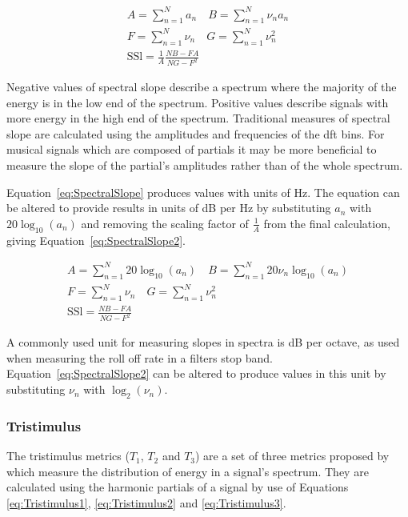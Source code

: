 			\begin{gather}
				A = \sum_{n = 1}^{N} a_{n}
				\quad 
				B = \sum_{n = 1}^{N} \nu_{n}a_{n} \nonumber \\
				F = \sum_{n = 1}^{N} \nu_{n} \quad G = \sum_{n = 1}^{N} \nu_{n}^{2} \nonumber \\
				\mathrm{SSl} = \frac{1}{A} \frac{NB - FA}{NG - F^{2}}
				\label{eq:SpectralSlope}
			\end{gather}

			Negative values of spectral slope describe a spectrum where the majority of the energy is in the
			low end of the spectrum. Positive values describe signals with more energy in the high end of the
			spectrum. Traditional measures of spectral slope are calculated using the amplitudes and
			frequencies of the \acrshort{dft} bins. For musical signals which are composed of partials it may
			be more beneficial to measure the slope of the partial's amplitudes rather than of the whole
			spectrum. 
			
			Equation~\ref{eq:SpectralSlope} produces values with units of Hz. The equation can be
			altered to provide results in units of dB per Hz by substituting $a_{n}$ with $20\log_{10}(a_{n})$
			and removing the scaling factor of $\frac{1}{A}$ from the final calculation, giving
			Equation~\ref{eq:SpectralSlope2}.
			
			\begin{gather}
				A = \sum_{n = 1}^{N} 20\log_{10}(a_{n})
				\quad 
				B = \sum_{n = 1}^{N} 20\nu_{n}\log_{10}(a_{n}) \nonumber \\
				F = \sum_{n = 1}^{N} \nu_{n} \quad G = \sum_{n = 1}^{N} \nu_{n}^{2} \nonumber \\
				\mathrm{SSl} = \frac{NB - FA}{NG - F^{2}}
				\label{eq:SpectralSlope2}
			\end{gather}
			
			A commonly used unit for measuring slopes in spectra is dB per octave, as used when measuring the
			roll off rate in a filters stop band. Equation~\ref{eq:SpectralSlope2} can be altered to produce
			values in this unit by substituting $\nu_{n}$ with $\log_{2}(\nu_{n})$.

		\subsubsection*{Tristimulus}
			The tristimulus metrics ($T_{1}$, $T_{2}$ and $T_{3}$) are a set of three metrics proposed by
			\citet{pollard1982a} which measure the distribution of energy in a signal's spectrum. They are
			calculated using the harmonic partials of a signal by use of Equations \ref{eq:Tristimulus1},
			\ref{eq:Tristimulus2} and \ref{eq:Tristimulus3}.
			
